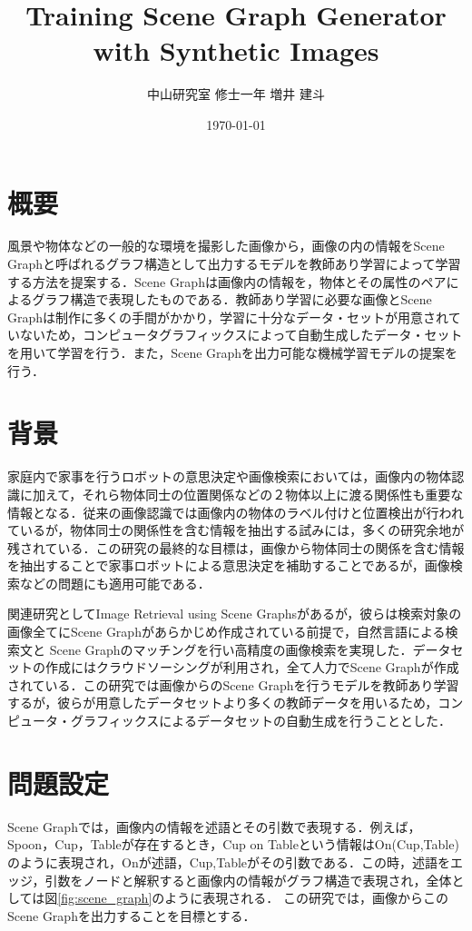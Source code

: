 

\title{Training Scene Graph Generator with Synthetic Images}
\author{中山研究室 修士一年 増井 建斗}
\date{\today}

\maketitle


\section{概要}
風景や物体などの一般的な環境を撮影した画像から，画像の内の情報をScene Graph\cite{scene_graph}と呼ばれるグラフ構造として出力するモデルを教師あり学習によって学習する方法を提案する．Scene Graphは画像内の情報を，物体とその属性のペアによるグラフ構造で表現したものである．教師あり学習に必要な画像とScene Graphは制作に多くの手間がかかり，学習に十分なデータ・セットが用意されていないため，コンピュータグラフィックスによって自動生成したデータ・セットを用いて学習を行う．また，Scene Graphを出力可能な機械学習モデルの提案を行う．
\section{背景}
家庭内で家事を行うロボットの意思決定や画像検索においては，画像内の物体認識に加えて，それら物体同士の位置関係などの２物体以上に渡る関係性も重要な情報となる．従来の画像認識では画像内の物体のラベル付けと位置検出が行われているが，物体同士の関係性を含む情報を抽出する試みには，多くの研究余地が残されている．この研究の最終的な目標は，画像から物体同士の関係を含む情報を抽出することで家事ロボットによる意思決定を補助することであるが，画像検索などの問題にも適用可能である．

関連研究としてImage Retrieval using Scene Graphs\cite{scene_graph}があるが，彼らは検索対象の画像全てにScene Graphがあらかじめ作成されている前提で，自然言語による検索文と
Scene Graphのマッチングを行い高精度の画像検索を実現した．データセットの作成にはクラウドソーシングが利用され，全て人力でScene Graphが作成されている．この研究では画像からのScene Graphを行うモデルを教師あり学習するが，彼らが用意したデータセットより多くの教師データを用いるため，コンピュータ・グラフィックスによるデータセットの自動生成を行うこととした．
\section{問題設定}
Scene Graphでは，画像内の情報を述語とその引数で表現する．例えば，Spoon，Cup，Tableが存在するとき，Cup on Tableという情報はOn(Cup,Table)のように表現され，Onが述語，Cup,Tableがその引数である．この時，述語をエッジ，引数をノードと解釈すると画像内の情報がグラフ構造で表現され，全体としては図\ref{fig:scene_graph}のように表現される．
この研究では，画像からこのScene Graphを出力することを目標とする．
